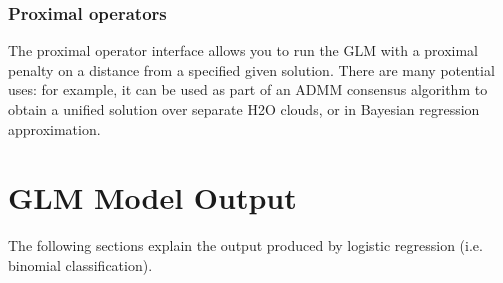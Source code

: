 \subsubsection{Proximal operators}

The proximal operator interface allows you to run the GLM with a proximal penalty on a distance from a specified
given solution. There are many potential uses: for example, it can be used as part of an ADMM consensus algorithm
to obtain a unified solution over separate H2O clouds, or in Bayesian regression approximation.


\section{GLM Model Output}

The following sections explain the output produced by logistic regression (i.e. binomial classification).

\bigskip
\waterExampleInR


